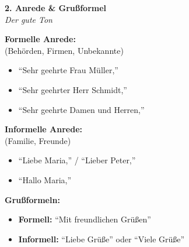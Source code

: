 \documentclass[a4paper,landscape,8pt]{extarticle}
\begin{document}
\hfill%
\begin{minipage}[t]{0.32\linewidth}
\begin{center}
\colorbox{textgreen!10}{%
\begin{minipage}{0.95\linewidth}
\vspace{2mm}
\begin{center}
{\Large\bfseries\textcolor{textgreen}{2. Anrede \& Grußformel}}\\[1pt]
{\footnotesize\itshape Der gute Ton}
\end{center}
\vspace{2mm}
\end{minipage}%
}
\end{center}

\vspace{1mm}

\textbf{Formelle Anrede:}\\
(Behörden, Firmen, Unbekannte)
\begin{itemize}
\item ``Sehr geehrte Frau Müller,''
\item ``Sehr geehrter Herr Schmidt,''
\item ``Sehr geehrte Damen und Herren,''
\end{itemize}

\textbf{Informelle Anrede:}\\
(Familie, Freunde)
\begin{itemize}
\item ``Liebe Maria,'' / ``Lieber Peter,''
\item ``Hallo Maria,''
\end{itemize}

\textbf{Grußformeln:}
\begin{itemize}
\item \textbf{Formell:} ``Mit freundlichen Grüßen''
\item \textbf{Informell:} ``Liebe Grüße'' oder ``Viele Grüße''
\end{itemize}

\vspace{2mm}

\end{minipage}%
\hfill%
\end{document}
